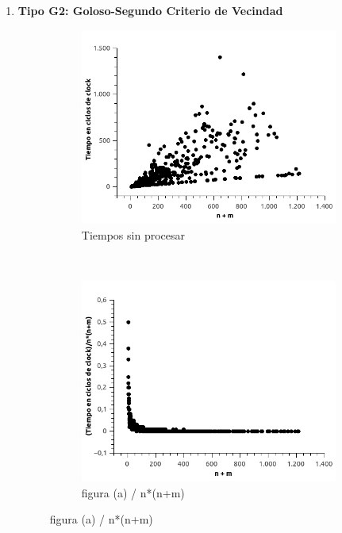 \begin{enumerate}
\begin{figure}[H]
\end{figure}



\item \textbf{Tipo G2: Goloso-Segundo Criterio de Vecindad}

\begin{figure}[H]
        \centering
        \begin{subfigure}[b]{0.5\textwidth}
                \includegraphics[width=\textwidth]{imagenes/ejer4-grafG2-1.jpg}
                \caption{Tiempos sin procesar}
        \end{subfigure}%
        ~ %
        \begin{subfigure}[b]{0.5\textwidth}
                \includegraphics[width=\textwidth]{imagenes/ejer4-grafG2-2.jpg}
                \caption{figura (a) / n*(n+m)}
        \end{subfigure}

\end{figure}


\end{enumerate}

